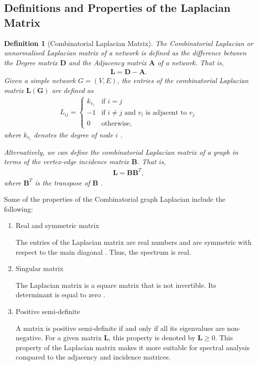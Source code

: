 \documentclass[10pt,a4paper]{article}
\newtheorem{defn}{Definition}
\begin{document}
\subsection{Definitions and Properties of the Laplacian Matrix}

\begin{defn}[Combinatorial Laplacian Matrix]
	The Combinatorial Laplacian or unnormalised Laplacian matrix of a network is defined as the difference between the Degree matrix $\mathbf{D}$ and the Adjacency matrix $\mathbf{A}$ of a network. That is,
	\begin{eqnarray}
	\mathbf{L} = \mathbf{D} - \mathbf{A}.
	\end{eqnarray}
	Given a simple network $G=(V,E)$, the entries of the combinatorial Laplacian matrix $\mathbf{L(G)}$  are defined as
	\begin{eqnarray}
	L_{ij} = \begin{cases} k_{v_i} &\mbox{if } i = j \\
	-1 &\mbox{if } i \neq j \text{ and } v_i \text{ is adjacent to } v_j \\
	0 & \text{otherwise},
	\end{cases}
	\end{eqnarray}
	where $k_{v_i}$  denotes the degree of node $i$ \citep{estrada2011structure}.
	
	Alternatively, we can define the combinatorial Laplacian matrix of a graph in terms of the vertex-edge incidence matrix $\mathbf{B}$. That is,
	\begin{eqnarray}
	\mathbf{L} =  \mathbf{B} \mathbf{B}^T,
	\label{lintermsb}
	\end{eqnarray}
	where $\mathbf{B}^T$ is the transpose of $\mathbf{B}$ \citep{estrada2011structure}.
\end{defn}

Some of the properties of the Combinatorial graph Laplacian  include the following:
\begin{enumerate}	
	\item{Real and symmetric matrix} 
	
	The entries of the Laplacian matrix are real numbers and are symmetric with respect to the main diagonal \citep{das2004laplacian}. Thus, the spectrum is real.
	\item{Singular matrix}
	
	The Laplacian matrix is a square matrix that is not invertible. Its determinant is equal to zero \citep{das2004laplacian}.
	\item{Positive semi-definite}
	
	A matrix is positive semi-definite if and only if all its eigenvalues are non-negative. For a given matrix $\mathbf{L}$, this property is denoted by $\mathbf{L}\geq 0$. This property of the Laplacian matrix makes it more suitable for spectral analysis compared to the adjacency and incidence matrices.
	
\end{enumerate}
\end{document}
